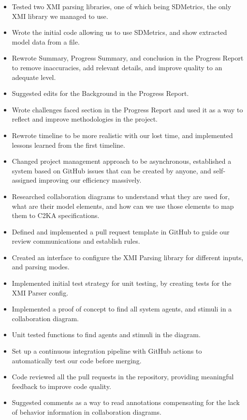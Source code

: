 \begin{itemize}
    \item Tested two XMI parsing libraries, one of which being SDMetrics, the only XMI library we managed to use.
    \item Wrote the initial code allowing us to use SDMetrics, and show extracted model data from a file.
    \item Rewrote Summary, Progress Summary, and conclusion in the Progress Report to remove inaccuracies, add relevant details, and improve quality to an adequate level.
    \item Suggested edits for the Background in the Progress Report.
    \item Wrote challenges faced section in the Progress Report and used it as a way to reflect and improve methodologies in the project.
    \item Rewrote timeline to be more realistic with our lost time, and implemented lessons learned from the first timeline.
    \item Changed project management approach to be asynchronous, established a system based on GitHub issues that can be created by anyone, and self-assigned improving our efficiency massively.
    \item Researched collaboration diagrams to understand what they are used for, what are their model elements,
    and how can we use those elements to map them to C2KA specifications.
    \item Defined and implemented a pull request template in GitHub to guide our review communications and establish rules.
    \item Created an interface to configure the XMI Parsing library for different inputs, and parsing modes.
    \item Implemented initial test strategy for unit testing, by creating tests for the XMI Parser config.
    \item Implemented a proof of concept to find all system agents, and stimuli in a collaboration diagram.
    \item Unit tested functions to find agents and stimuli in the diagram.
    \item Set up a continuous integration pipeline with GitHub actions to automatically test our code before merging.
    \item Code reviewed all the pull requests in the repository, providing meaningful feedback to improve code quality.
    \item Suggested comments as a way to read annotations compensating for the lack of behavior information in collaboration diagrams.

\end{itemize}
